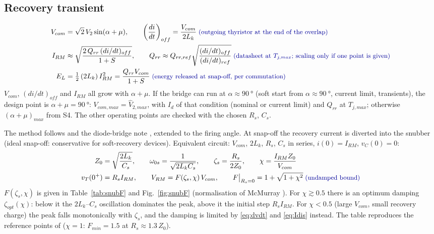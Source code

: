 \documentclass[10pt,a4paper]{scrartcl}
\newcommand{\Id}{I_{d}}
\newcommand{\Vll}{V_{2}}
\newcommand{\Lk}{L_{k}}
\newcommand{\rt}[1]{\text{\small\color{blue!60!black} #1}}
\begin{document}
\subsection{Recovery transient}
\begin{align}
V_{com} &= \sqrt2\,\Vll\sin(\alpha+\mu), \qquad
\left(\frac{di}{dt}\right)_{off} = \frac{V_{com}}{2\Lk} \;\rt{(outgoing thyristor at the end of the overlap)} \label{eq:Vcom}\\
I_{RM} &\approx \sqrt{\frac{2\,Q_{rr}\,(di/dt)_{off}}{1+S}}, \qquad
Q_{rr} \approx Q_{rr,ref}\sqrt{\frac{(di/dt)_{off}}{(di/dt)_{ref}}} \;\rt{(datasheet at $T_{j,max}$; scaling only if one point is given)} \label{eq:IRM}\\
E_L &= \tfrac12\,(2\Lk)\,I_{RM}^2 = \frac{Q_{rr}V_{com}}{1+S} \;\rt{(energy released at snap-off, per commutation)} \label{eq:EL}
\end{align}
$V_{com}$, $(di/dt)_{off}$ and $I_{RM}$ all grow with $\alpha+\mu$. If the bridge can run at $\alpha\approx\SI{90}{\degree}$ (soft start from $\alpha\approx\SI{90}{\degree}$, current limit, transients), the design point is $\alpha+\mu = \SI{90}{\degree}$: $V_{com,max} = \hat V_{2,max}$, with $\Id$ of that condition (nominal or current limit) and $Q_{rr}$ at $T_{j,max}$; otherwise $(\alpha+\mu)_{max}$ from S4. The other operating points are checked with the chosen $R_s$, $C_s$.

The method follows \cite{mcmurray,mohan,abb5sya2020} and the diode-bridge note \cite{bagnara_snub}, extended to the firing angle. At snap-off the recovery current is diverted into the snubber (ideal snap-off: conservative for soft-recovery devices). Equivalent circuit: $V_{com}$, $2\Lk$, $R_s$, $C_s$ in series, $i(0) = I_{RM}$, $v_C(0) = 0$:
\begin{align}
Z_0 &= \sqrt{\frac{2\Lk}{C_s}}, \qquad
\omega_{0s} = \frac{1}{\sqrt{2\Lk C_s}}, \qquad
\zeta_s = \frac{R_s}{2Z_0}, \qquad
\chi = \frac{I_{RM}Z_0}{V_{com}} \label{eq:snubpar}\\
v_T(0^+) &= R_sI_{RM}, \qquad
V_{RM} = F(\zeta_s,\chi)\,V_{com}, \qquad
F\big|_{R_s=0} = 1+\sqrt{1+\chi^2} \;\rt{(undamped bound)} \label{eq:VRM}
\end{align}
$F(\zeta_s,\chi)$ is given in Table~\ref{tab:snubF} and Fig.~\ref{fig:snubF} (normalisation of McMurray \cite{mcmurray}). For $\chi\gtrsim0.5$ there is an optimum damping $\zeta_{opt}(\chi)$: below it the $2\Lk$--$C_s$ oscillation dominates the peak, above it the initial step $R_sI_{RM}$. For $\chi<0.5$ (large $V_{com}$, small recovery charge) the peak falls monotonically with $\zeta_s$, and the damping is limited by \eqref{eq:dvdt} and \eqref{eq:Idis} instead. The table reproduces the reference points of \cite{mohan} ($\chi = 1$: $F_{min} = 1.5$ at $R_s\approx1.3\,Z_0$).
\end{document}
